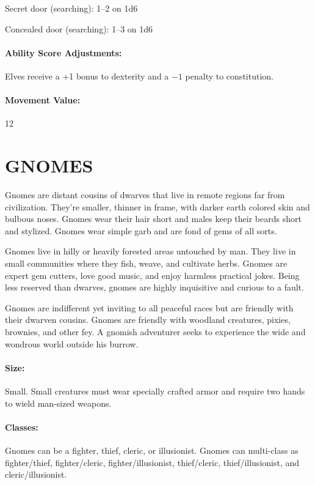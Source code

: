 \begin{multicols}{2}
Secret door (searching): 1--2 on 1d6

Concealed door (searching): 1--3 on 1d6

\paragraph{Ability Score Adjustments:} Elves receive a +1 bonus to dexterity and a $-1$ penalty to constitution.  

\paragraph{Movement Value:} 12

\section{GNOMES}

Gnomes are distant cousins of dwarves that live in remote regions far from civilization.  They're smaller, thinner in frame, with darker earth colored skin and bulbous noses.  Gnomes wear their hair short and males keep their beards short and stylized.  Gnomes wear simple garb and are fond of gems of all sorts.

Gnomes live in hilly or heavily forested areas untouched by man.  They live in small communities where they fish, weave, and cultivate herbs.  Gnomes are expert gem cutters, love good music, and enjoy harmless practical jokes.  Being less reserved than dwarves, gnomes are highly inquisitive and curious to a fault.   

Gnomes are indifferent yet inviting to all peaceful races but are friendly with their dwarven cousins.  Gnomes are friendly with woodland creatures, pixies, brownies, and other fey.  A gnomish adventurer seeks to experience the wide and wondrous world outside his burrow.

\paragraph{Size:} Small.  Small creatures must wear specially crafted armor and require two hands to wield man-sized weapons.

\paragraph{Classes:} Gnomes can be a fighter, thief, cleric, or illusionist.  Gnomes can multi-class as fighter/thief, fighter/cleric, fighter/illusionist, thief/cleric, thief/illusionist, and cleric/illusionist.  


\end{multicols}
